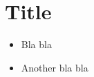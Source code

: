 
\section{Title}
\label{sec:name}


  
 \begin{itemize}
 \item Bla bla
 \item Another bla bla
 \end{itemize}
  

